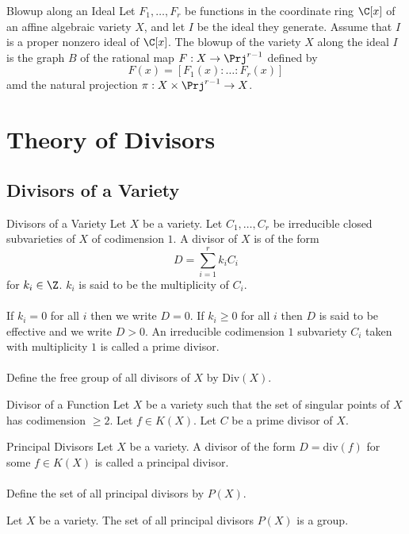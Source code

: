 \documentclass[a4paper]{article}
\begin{document}
\begin{defn}{Blowup along an Ideal}{} Let $F_1,\dots,F_r$ be functions in the coordinate ring $\C[x]$ of an affine algebraic variety $X$, and let $I$ be the ideal they generate. Assume that $I$ is a proper nonzero ideal of $\C[x]$. The blowup of the variety $X$ along the ideal $I$ is the graph $B$ of the rational map $F:X\to\Prj^{r-1}$ defined by $$F(x)=[F_1(x):\dots:F_r(x)]$$ amd the natural projection $\pi:X\times\Prj^{r-1}\to X$. 
\end{defn}

\pagebreak
\section{Theory of Divisors}
\subsection{Divisors of a Variety}
\begin{defn}{Divisors of a Variety}{} Let $X$ be a variety. Let $C_1,\dots,C_r$ be irreducible closed subvarieties of $X$ of codimension $1$. A divisor of $X$ is of the form $$D=\sum_{i=1}^rk_iC_i$$ for $k_i\in\Z$. $k_i$ is said to be the multiplicity of $C_i$. \\~\\
If $k_i=0$ for all $i$ then we write $D=0$. If $k_i\geq 0$ for all $i$ then $D$ is said to be effective and we write $D>0$. An irreducible codimension $1$ subvariety $C_i$ taken with multiplicity $1$ is called a prime divisor. \\~\\
Define the free group of all divisors of $X$ by $\text{Div}(X)$. 
\end{defn}

\begin{defn}{Divisor of a Function}{} Let $X$ be a variety such that the set of singular points of $X$ has codimension $\geq 2$. Let $f\in K(X)$. Let $C$ be a prime divisor of $X$. 
\end{defn}

\begin{defn}{Principal Divisors}{} Let $X$ be a variety. A divisor of the form $D=\text{div}(f)$ for some $f\in K(X)$ is called a principal divisor. \\~\\
Define the set of all principal divisors by $P(X)$. 
\end{defn}

\begin{prp}{}{} Let $X$ be a variety. The set of all principal divisors $P(X)$ is a group. 
\end{prp}
\end{document}

